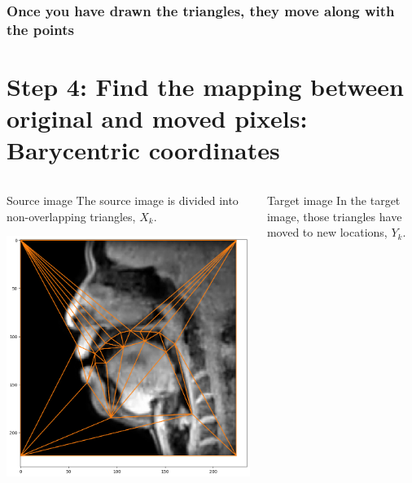 \documentclass{beamer}
\begin{document}
\begin{frame}
  \frametitle{Once you have drawn the triangles, they move along with the points}
  \centerline{}
\end{frame}


\section[Barycentric coordinates]{Step 4: Find the mapping between original and moved pixels: Barycentric coordinates}
\setcounter{subsection}{1}

\begin{frame}
  \begin{columns}[t]
    \column{2.5in}
    \begin{block}{Source image}
      The source image is divided into non-overlapping triangles, $X_k$.
      \centerline{\includegraphics[width=\textwidth]{triangles.png}}
    \end{block}
    \column{2.25in}
    \begin{block}{Target image}
      In the target image, those triangles have moved to new locations, $Y_k$.
      \centerline{}
    \end{block}
  \end{columns}
\end{frame}  
\end{document}
